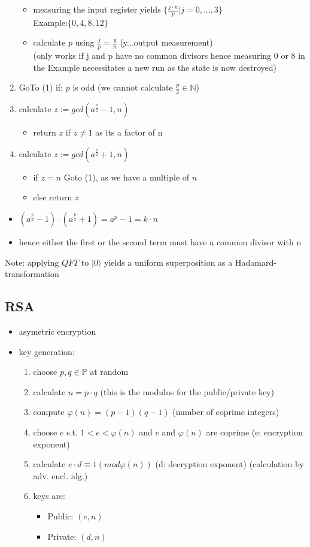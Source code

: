 \documentclass[12pt,a4paper]{article}
\newcommand{\ecb}[1]{\{#1\}}
\newcommand{\ket}[1]{\vert #1 \rangle}
\begin{document}
\begin{enumerate}
\begin{itemize}
\item measuring the input register yields $\ecb{\frac{j\cdot n}{p}\vert j=0,...,3}$\\Example:$\ecb{0,4,8,12}$
\item calculate $p$ using $\frac{j}{p}=\frac{y}{n}$ (y...output measurement)\\
(only works if j and p have no common divisors hence measuring 0 or 8 in the Example necessitates a new run as the state is now destroyed)
\end{itemize}
\item GoTo (1) if: $p$ is odd (we cannot calculate $\frac{p}{2}\in\mathbb{N}$)
\item calculate $z:=gcd(a^{\frac{p}{2}}-1,n)$
\begin{itemize}
\item return $z$ if $z\neq 1$ as its a factor of n
\end{itemize}
\item calculate $z:=gcd(a^{\frac{p}{2}}+1,n)$
\begin{itemize}
\item if $z=n$ Goto (1), as we have a multiple of $n$ 
\item else return $z$
\end{itemize}
\end{enumerate}
\begin{itemize}
\item $(a^{\frac{p}{2}}-1)\cdot (a^{\frac{p}{2}}+1) = a^p -1 = k \cdot n$
\item hence either the first or the second term must have a common divisor with n
\end{itemize}

Note: applying $QFT$ to $\ket{0}$ yields a uniform superposition as a Hadamard-transformation

\subsection{RSA}
\begin{itemize}
\item asymetric encryption
\item key generation:
\begin{enumerate}
\item choose $p,q\in\mathbb{P}$ at random
\item calculate $n=p\cdot q$ (this is the modulus for the public/private key)
\item compute $\varphi(n) = (p-1)(q-1)$ (number of coprime integers)
\item choose $e$ s.t. $1 < e < \varphi(n)$ and $e$ and $\varphi(n)$ are coprime (e: encryption exponent)
\item calculate $e\cdot d \equiv 1 (mod \varphi(n))$ (d: decryption exponent) (calculation by adv. eucl. alg.)
\item keys are:
\begin{itemize}
\item Public: $(e, n)$
\item Private: $(d, n)$
\end{itemize}
\end{enumerate}
\end{itemize}
\end{document}
